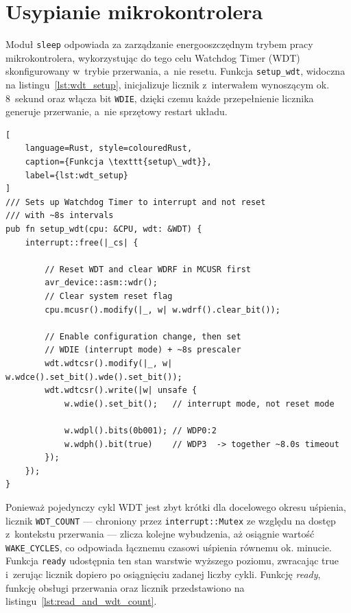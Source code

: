 \section{Usypianie mikrokontrolera}
Moduł \texttt{sleep} odpowiada za zarządzanie energooszczędnym 
trybem pracy mikrokontrolera, wykorzystując do tego celu 
Watchdog Timer (WDT) skonfigurowany w~trybie przerwania, a~nie resetu. 
Funkcja \texttt{setup\_wdt}, widoczna na listingu~\ref{lst:wdt_setup},
inicjalizuje licznik z~interwałem wynoszącym ok. 
8~sekund oraz włącza bit \texttt{WDIE}, dzięki czemu każde przepełnienie 
licznika generuje przerwanie, a~nie sprzętowy restart układu. 

\begin{lstlisting}[
    language=Rust, style=colouredRust, 
    caption={Funkcja \texttt{setup\_wdt}},
    label={lst:wdt_setup}
]
/// Sets up Watchdog Timer to interrupt and not reset
/// with ~8s intervals
pub fn setup_wdt(cpu: &CPU, wdt: &WDT) {
    interrupt::free(|_cs| {

        // Reset WDT and clear WDRF in MCUSR first
        avr_device::asm::wdr();
        // Clear system reset flag
        cpu.mcusr().modify(|_, w| w.wdrf().clear_bit());

        // Enable configuration change, then set 
        // WDIE (interrupt mode) + ~8s prescaler
        wdt.wdtcsr().modify(|_, w| w.wdce().set_bit().wde().set_bit());
        wdt.wdtcsr().write(|w| unsafe {
            w.wdie().set_bit();   // interrupt mode, not reset mode

            w.wdpl().bits(0b001); // WDP0:2
            w.wdph().bit(true)    // WDP3  -> together ~8.0s timeout
        });
    });
}
\end{lstlisting}

Ponieważ pojedynczy cykl WDT jest zbyt krótki dla docelowego okresu 
uśpienia, licznik \texttt{WDT\_COUNT} — chroniony przez \texttt{interrupt::Mutex} ze 
względu na dostęp z~kontekstu przerwania — zlicza kolejne wybudzenia, 
aż osiągnie wartość \texttt{WAKE\_CYCLES}, co odpowiada łącznemu czasowi uśpienia 
równemu ok. minucie. Funkcja \texttt{ready} udostępnia ten stan warstwie 
wyższego poziomu, zwracając true i~zerując licznik dopiero po 
osiągnięciu zadanej liczby cykli. Funkcję \textsl{ready}, funkcję obsługi przerwania
oraz licznik przedstawiono 
na listingu~\ref{lst:read_and_wdt_count}.

